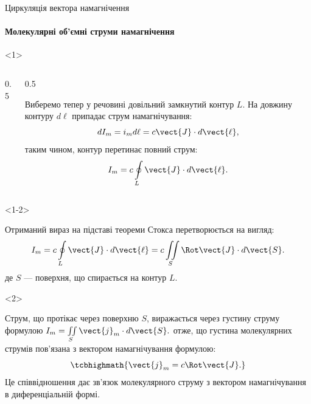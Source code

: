 \documentclass[onlytextwidth]{beamer}
\begin{document}
\begin{frame}{Циркуляція вектора намагнічення}{}
	\framesubtitle<2>{Молекулярні об'ємні струми намагнічення}
	\begin{onlyenv}
		\begin{columns}
			\begin{column}{0.5\linewidth}
				
			\end{column}
			\begin{column}{0.5\linewidth}
				\begin{block}{}\justifying\small
					Виберемо тепер у речовині довільний замкнутий контур {\color{green!50!black}$L$}. На довжину контуру $d\ell$ припадає струм
					намагнічування:
					\begin{equation*}
						dI_m = i_m d\ell =  c\vect{J}\cdot d\vect{\ell},
					\end{equation*}
					таким чином,  контур перетинає повний струм:
					\begin{equation*}
						I_m = c\oint\limits_L \vect{J}\cdot d\vect{\ell}.
					\end{equation*}
				\end{block}
			\end{column}
		\end{columns}
	\end{onlyenv}
	\begin{onlyenv}<1-2>
		\begin{block}{}\justifying
			Отриманий вираз на підставі теореми Стокса перетворюється на вигляд:
			\begin{equation*}
				I_m = c\oint\limits_L \vect{J}\cdot d\vect{\ell} = c \iint\limits_S \Rot\vect{J}\cdot d\vect{S}.
			\end{equation*}
			де $S$ --- поверхня, що спирається на контур $L$.
		\end{block}
	\end{onlyenv}
	\begin{onlyenv}
		\begin{block}{}\justifying
			Струм, що протікає через поверхню $S$, виражається через густину струму формулою
			\(
			I_m = \iint\limits_S \vect{j}_m\cdot d\vect{S}.
			\)
			отже, що густина молекулярних струмів пов'язана з вектором намагнічування
			формулою:
			\begin{equation*}
				\tcbhighmath{\vect{j}_m = c\Rot\vect{J}.}
			\end{equation*}
			Це співвідношення дає \alert{зв'язок молекулярного струму з вектором намагнічування в диференціальній формі}.
		\end{block}
	\end{onlyenv}
\end{frame}
\end{document}

